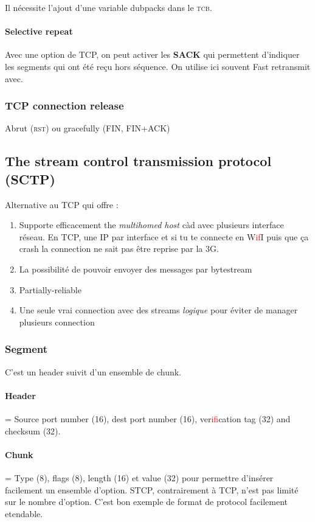 Il nécessite l'ajout d'une variable dubpacks dans le \textsc{tcb}.

\paragraph{Selective repeat}
Avec une option de TCP, on peut activer les \textbf{SACK} qui permettent d'indiquer
les segments qui ont été reçu hors séquence. On utilise ici souvent Fast retransmit avec.

\subsubsection{TCP connection release}
Abrut (\textsc{rst}) ou gracefully (FIN, FIN+ACK)

\subsection{The stream control transmission protocol (SCTP) }
Alternative au TCP qui offre :
\begin{enumerate}
    \item Supporte efficacement the \textit{multihomed host} càd avec plusieurs interface réseau. En TCP, une IP par interface et si tu te connecte en W\textcolor{red}{if}I puis que ça
        crash la connection ne sait pas être reprise par la 3G.
    \item La possibilité de pouvoir envoyer des messages par bytestream
    \item Partially-reliable
    \item Une seule vrai connection avec des streams \textit{logique} pour éviter de manager
        plusieurs connection
\end{enumerate}

\subsubsection{Segment}
C'est un header suivit d'un ensemble de chunk.

\paragraph{Header} = Source port number (16), dest port number (16), ver\textcolor{red}{if}ication tag (32) and checksum (32).

\paragraph{Chunk} = Type (8), flags (8), length (16) et value (32) pour permettre d'insérer facilement un ensemble d'option. STCP, contrairement à TCP, n'est pas limité sur le nombre d'option. C'est bon exemple de format de protocol facilement etendable.

